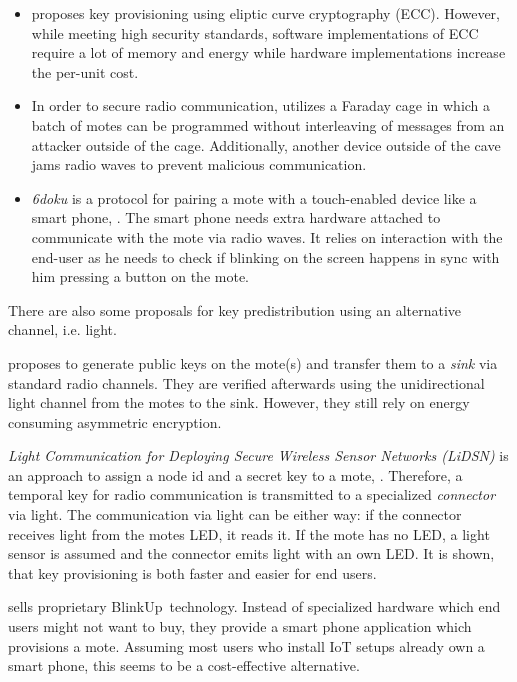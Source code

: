 \documentclass{sig-alternate} %
\begin{document}
\begin{itemize}
	\item \cite{chen2011over} proposes key provisioning using eliptic curve cryptography (ECC). However, while meeting high security standards, software implementations of ECC require a lot of memory and energy while hardware implementations increase the per-unit cost.
	\item In order to secure radio communication, \cite{kuo2007message} utilizes a Faraday cage in which a batch of motes can be programmed without interleaving of messages from an attacker outside of the cage. Additionally, another device outside of the cave jams radio waves to prevent malicious communication.
	\item \textit{6doku} is a protocol for pairing  a mote with a touch-enabled device like a smart phone, \cite{krentz20156doku}. The smart phone needs extra hardware attached to communicate with the mote via radio waves. It relies on interaction with the end-user as he needs to check if blinking on the screen happens in sync with him pressing a button on the mote.
\end{itemize}

There are also some proposals for key predistribution using an alternative channel, i.e. light.

\cite{saxena2009blink} proposes to generate public keys on the mote(s) and transfer them to a \textit{sink} via standard radio channels.
They are verified afterwards using the unidirectional light channel from the motes to the sink.
However, they still rely on energy consuming asymmetric encryption.

\textit{Light Communication for Deploying Secure Wireless Sensor Networks (LiDSN)} is an approach to assign a node id and a secret key to a mote, \cite{doan2012lidsn}.
Therefore, a temporal key for radio communication is transmitted to a specialized \textit{connector} via light.
The communication via light can be either way: if the connector receives light from the motes LED, it reads it. If the mote has no LED, a light sensor is assumed and the connector emits light with an own LED.
It is shown, that key provisioning is both faster and easier for end users.

\cite{electricimp} sells proprietary BlinkUp~\texttrademark  technology.
Instead of specialized hardware which end users might not want to buy, they provide a smart phone application which provisions a mote.
Assuming most users who install IoT setups already own a smart phone, this seems to be a cost-effective alternative.
\end{document}
